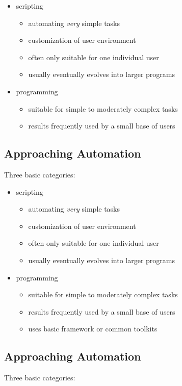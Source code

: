 \documentclass[xga]{xdvislides}
\begin{document}
\begin{itemize}
	\item scripting
		\begin{itemize}
			\item automating {\em very} simple tasks
			\item customization of user environment
			\item often only suitable for one individual user
			\item usually eventually evolves into larger programs
		\end{itemize}
	\item programming
		\begin{itemize}
			\item suitable for simple to moderately complex tasks
			\item results frequently used by a small base of users
		\end{itemize}
\end{itemize}

\subsection{Approaching Automation}
Three basic categories:
\\

\begin{itemize}
	\item scripting
		\begin{itemize}
			\item automating {\em very} simple tasks
			\item customization of user environment
			\item often only suitable for one individual user
			\item usually eventually evolves into larger programs
		\end{itemize}
	\item programming
		\begin{itemize}
			\item suitable for simple to moderately complex tasks
			\item results frequently used by a small base of users
			\item uses basic framework or common toolkits
		\end{itemize}
\end{itemize}

\subsection{Approaching Automation}
Three basic categories:
\\
\end{document}
